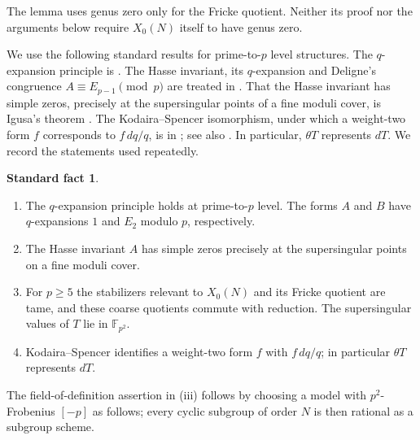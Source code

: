 \documentclass[11pt,a4paper]{article}
\numberwithin{equation}{section}
\theoremstyle{definition}
\newtheorem{fact}{Standard fact}
\theoremstyle{remark}
\newcommand{\Fq}{\mathbb F_{p^2}}
\begin{document}
The lemma uses genus zero only for the Fricke quotient. Neither its
proof nor the arguments below require $X_0(N)$ itself to have genus zero.


We use the following standard results for prime-to-$p$ level structures.
The $q$-expansion principle is \citet[\S1.6]{Katz73}. The Hasse invariant,
its $q$-expansion and Deligne's congruence $A\equiv E_{p-1}\pmod p$ are
treated in \citet[\S\S2.0--2.1]{Katz73}. That the Hasse invariant has simple
zeros, precisely at the supersingular points of a fine moduli cover, is
Igusa's theorem \citep[Ch.~12]{KM85}. The Kodaira--Spencer isomorphism,
under which a weight-two form $f$ corresponds to $f\,dq/q$, is in
\citet[Appendix~1]{Katz73}; see also \citet{Gross90}. In particular,
$\theta T$ represents $dT$. We record the statements used repeatedly.
\begin{fact}\label{fact:modp}\leavevmode
\begin{enumerate}[label=\textup{(\roman*)}]
\item The $q$-expansion principle holds at prime-to-$p$ level. The forms
$A$ and $B$ have $q$-expansions $1$ and $E_2$ modulo $p$, respectively.
\item The Hasse invariant $A$ has simple zeros precisely at the
supersingular points on a fine moduli cover.
\item For $p\ge5$ the stabilizers relevant to $X_0(N)$ and its Fricke
quotient are tame, and these coarse quotients commute with reduction.
The supersingular values of $T$ lie in $\Fq$.
\item Kodaira--Spencer identifies a weight-two form $f$ with
$f\,dq/q$; in particular $\theta T$ represents $dT$.
\end{enumerate}
\end{fact}
The field-of-definition assertion in (iii) follows by choosing a model
with $p^2$-Frobenius $[-p]$ as follows; every cyclic subgroup of order
$N$ is then rational as a subgroup scheme.
\end{document}
